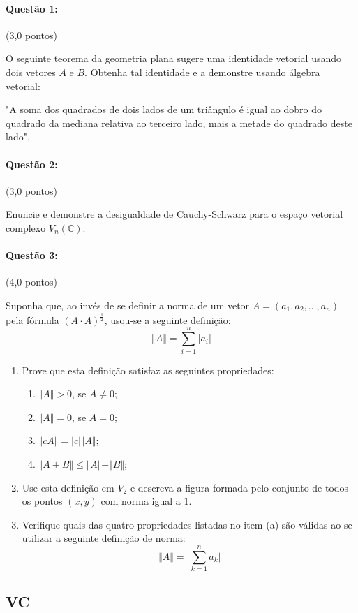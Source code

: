 \documentclass[12pt,a4paper]{article}
\newcommand{\modu}[1]{\vert #1 \vert}
\newcommand{\norm}[1]{\Vert #1 \Vert}
\begin{document}
\paragraph{Questão 1:} (3,0 pontos)

O seguinte teorema da geometria plana sugere uma identidade vetorial usando dois vetores $A$ e $B$. Obtenha tal identidade e a demonstre usando álgebra vetorial:

"A soma dos quadrados de dois lados de um triângulo é igual ao dobro do quadrado da mediana relativa ao terceiro lado, mais a metade do quadrado deste lado".

\paragraph{Questão 2:} (3,0 pontos)

Enuncie e demonstre a desigualdade de Cauchy-Schwarz para o espaço vetorial complexo $V_n(\mathbb{C})$.

\paragraph{Questão 3:} (4,0 pontos)

Suponha que, ao invés de se definir a norma de um vetor $A=(a_1,a_2,\dots,a_n)$ pela fórmula $(A\cdot A)^{\frac{1}{2}}$, usou-se a seguinte definição: 
$$ \norm{A}=\sum_{i=1}^n \modu{a_i}$$

\begin{enumerate}[label=(\alph*)]
\item Prove que esta definição satisfaz as seguintes propriedades: 
\begin{enumerate}[label=(\roman*)]
\item $\norm{A}>0$, se $A \neq 0$;
\item $\norm{A}=0$, se $A=0$;
\item $\norm{cA}=\modu{c}\norm{A}$;
\item $\norm{A+B}\leq \norm{A}+\norm{B}$;
\end{enumerate}
\item Use esta definição em $V_2$ e descreva a figura formada pelo conjunto de todos os pontos $(x,y)$ com norma igual a $1$.
\item Verifique quais das quatro propriedades listadas no item (a) são válidas ao se utilizar a seguinte definição de norma:
$$ \norm{A} = \modu{\sum_{k=1}^n a_k}$$
\end{enumerate}
\newpage


\subsection{VC}
\end{document}
